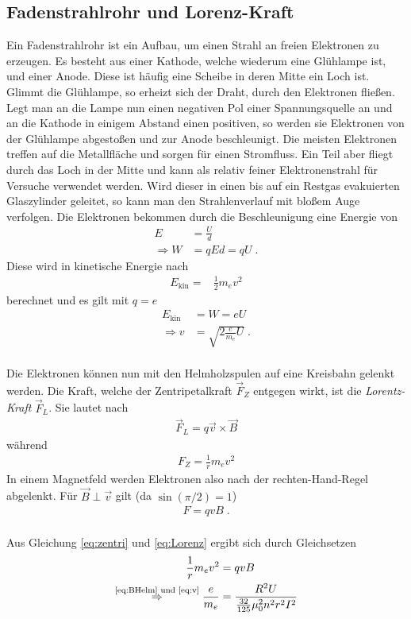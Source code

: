 \documentclass[12pt,a4paper,titlepage,headinclude,bibtotoc]{scrartcl}
\numberwithin{equation}{section}
\begin{document}
\subsection{Fadenstrahlrohr und Lorenz-Kraft}
Ein Fadenstrahlrohr ist ein Aufbau, um einen Strahl an freien Elektronen zu erzeugen.
Es besteht aus einer Kathode, welche wiederum eine Glühlampe ist, und einer Anode.
Diese ist häufig eine Scheibe in deren Mitte ein Loch ist.
Glimmt die Glühlampe, so erheizt sich der Draht, durch den Elektronen fließen.
Legt man an die Lampe nun einen negativen Pol einer Spannungsquelle an und an die Kathode in einigem Abstand einen positiven, so werden sie Elektronen von der Glühlampe abgestoßen und zur Anode beschleunigt.
Die meisten Elektronen treffen auf die Metallfläche und sorgen für einen Stromfluss.
Ein Teil aber fliegt durch das Loch in der Mitte und kann als relativ feiner Elektronenstrahl für Versuche verwendet werden.
Wird dieser in einen bis auf ein Restgas evakuierten Glaszylinder geleitet, so kann man den Strahlenverlauf mit bloßem Auge verfolgen.
Die Elektronen bekommen durch die Beschleunigung eine Energie von
\begin{align*}
	E&=\frac{U}{d}\\
	\Rightarrow W&=qEd=qU\; .
\end{align*}
Diese wird in kinetische Energie nach
\begin{align*}
	E_\text{kin}=&\frac{1}{2}m_ev^2
\end{align*}
berechnet und es gilt mit $q=e$
\begin{align}
	E_\text{kin}&=W=eU\\
	\Rightarrow v&=\sqrt{2\frac{e}{m_e}U}\;. \label{eq:v}
\end{align}
\\
Die Elektronen können nun mit den Helmholzspulen auf eine Kreisbahn gelenkt werden.
Die Kraft, welche der Zentripetalkraft $\vec F_Z$ entgegen wirkt, ist die \emph{Lorentz-Kraft} $\vec F_L$.
Sie lautet nach \cite[S. 368]{gerthsen}
\begin{align*}
	\vec F_L=q\vec v\times\vec B
\end{align*}
während
\begin{align}
	F_Z=\frac{1}{r}m_ev^2\label{eq:zentri}
\end{align}
In einem Magnetfeld werden Elektronen also nach der rechten-Hand-Regel abgelenkt.
Für $\vec B\perp \vec v$ gilt (da $\sin(\pi/2)=1$)
\begin{align}
	F=qvB\; . \label{eq:Lorenz}
\end{align}
\\
Aus Gleichung \eqref{eq:zentri} und \eqref{eq:Lorenz} ergibt sich durch Gleichsetzen
\begin{align}
	\frac{1}{r}m_ev^2&=qvB\label{eq:ZgleichL}\\
	\stackrel{\text{\eqref{eq:BHelm} und \eqref{eq:v}}}{\Rightarrow} \frac{e}{m_e}&=\frac{R^2U}{\frac{32}{125}\mu_0^2n^2r^2I^2}\label{eq:em}
\end{align}
\end{document}

